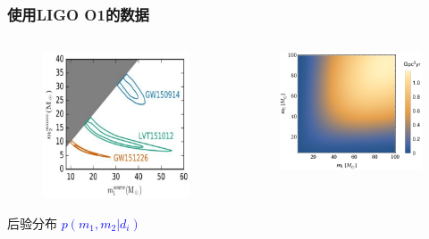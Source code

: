 \documentclass[xcolor={svgnames},compress]{beamer}
\begin{document}
\begin{frame}
    \frametitle{使用LIGO O1的数据}
    \vspace{-3mm}
    \begin{columns}
        \begin{column}{0.5\textwidth} 
            \begin{figure}[htbp!]
                \centering
                \includegraphics[width = \textwidth]{./pic/mass_post.pdf}
            \end{figure}
            \vspace{-3.mm}
            \centering
            后验分布 \textcolor{blue}{$p(m_1, m_2|d_i)$}
        \end{column}
        \begin{column}{0.58\textwidth} 
            \begin{figure}[htbp!]
                \centering
                \includegraphics[width = \textwidth]{./pic/vt.pdf}

\end{figure}
\end{column}
\end{columns}
\end{frame}
\end{document}
